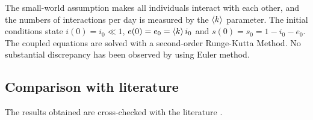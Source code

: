 The small-world assumption makes all individuals interact with each other, and the numbers of interactions per day is measured by the $\braket{k}$ parameter. The initial conditions state $i(0) = i_0 \ll 1$, $e(0) = e_0 = \braket{k}i_0$ and $s(0) = s_0 = 1-i_0-e_0$. The coupled equations are solved with a second-order Runge-Kutta Method. No substantial discrepancy has been observed by using Euler method.


\subsection{Comparison with literature}
The results obtained are cross-checked with the literature \cite{MingLiu}.